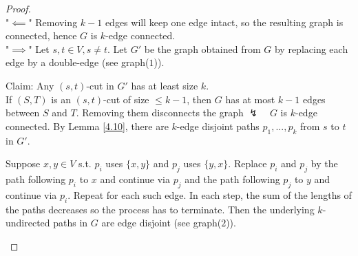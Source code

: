 \begin{proof}
    \hfill \\
    "$\impliedby$" Removing $k-1$ edges will keep one edge intact, so the resulting graph is connected, hence $G$ is $k$-edge connected.\\
    "$\implies$" Let $s,t\in V,s\neq t$. Let $G'$ be the graph obtained from $G$ by replacing each edge by a double-edge (see graph($1$)).\par

    Claim: Any $(s,t)$-cut in $G'$ has at least size $k$.\\
    If $(S,T)$ is an $(s,t)$-cut of size $\leq k-1$, then $G$ has at most $k-1$ edges between $S$ and $T$. Removing them disconnects the graph $\lightning\quad G$ is $k$-edge connected. By Lemma \ref{4.10}, there are $k$-edge disjoint paths $p_1,...,p_k$ from $s$ to $t$ in $G'$.\par

    Suppose $x,y\in V$ s.t. $p_i$ uses $\{x,y\}$ and $p_j$ uses $\{y,x\}$. Replace $p_i$ and $p_j$ by the path following $p_i$ to $x$ and continue via $p_j$ and the path following $p_j$ to $y$ and continue via $p_i$. Repeat for each such edge. In each step, the sum of the lengths of the paths decreases so the process has to terminate. Then the underlying $k$-undirected paths in $G$ are edge disjoint (see graph($2$)).\\
    \begin{center}
\end{center}
\end{proof}
